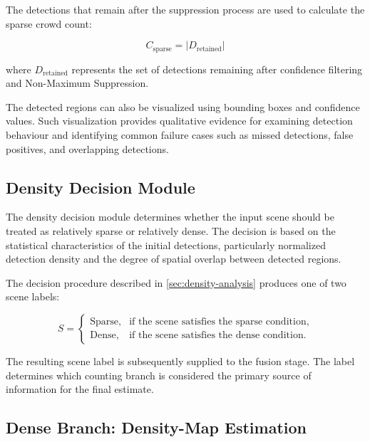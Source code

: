 \documentclass[12pt,a4paper]{report}
\begin{document}
The detections that remain after the suppression process are used to
calculate the sparse crowd count:

\begin{equation}
C_{\mathrm{sparse}}
=
\left|D_{\mathrm{retained}}\right|
\label{eq:proposed-sparse-count}
\end{equation}

where $D_{\mathrm{retained}}$ represents the set of detections remaining
after confidence filtering and Non-Maximum Suppression.

The detected regions can also be visualized using bounding boxes and
confidence values. Such visualization provides qualitative evidence for
examining detection behaviour and identifying common failure cases such as
missed detections, false positives, and overlapping detections.


\subsection{Density Decision Module}

The density decision module determines whether the input scene should be
treated as relatively sparse or relatively dense. The decision is based on
the statistical characteristics of the initial detections, particularly
normalized detection density and the degree of spatial overlap between
detected regions.

The decision procedure described in \cref{sec:density-analysis} produces one of two scene
labels:

\begin{equation}
S =
\begin{cases}
\text{Sparse}, & \text{if the scene satisfies the sparse condition},\\
\text{Dense}, & \text{if the scene satisfies the dense condition}.
\end{cases}
\label{eq:scene-label}
\end{equation}

The resulting scene label is subsequently supplied to the fusion stage.
The label determines which counting branch is considered the primary source
of information for the final estimate.


\subsection{Dense Branch: Density-Map Estimation}
\end{document}
